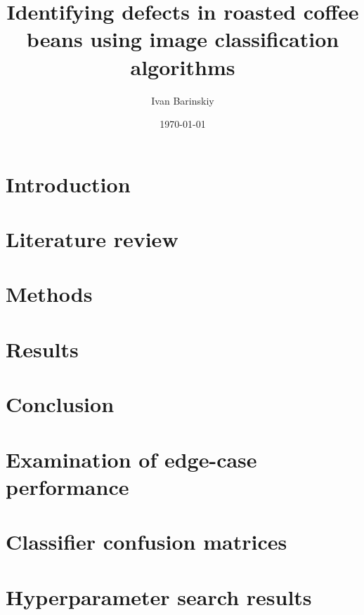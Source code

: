 \documentclass{./template/UoYCSproject}
\author{Ivan Barinskiy}
\date{\today}
\title{Identifying defects in roasted coffee beans using image classification algorithms}
\begin{document}
	\maketitle

	\listoffigures

	\listoftables

	\begin{summary}
		
	\end{summary}

	\chapter{Introduction}
	\label{ch:introduction}
	

	\chapter{Literature review}
	\label{ch:litreview}
	

	\chapter{Methods}
	\label{ch:methods}
	

	\chapter{Results}
	\label{ch:results}
    

	\chapter{Conclusion}
	\label{ch:conclusion}
	

	\appendix
	\chapter{Examination of edge-case performance}
	\label{ch:appendix1}
	

	\chapter{Classifier confusion matrices}
	\label{ch:appendix2}
	

	\chapter{Hyperparameter search results}
	\label{ch:appendix3}
	

	\printbibliography
\end{document}
